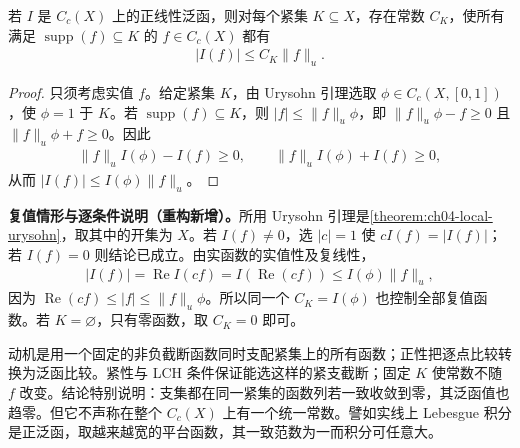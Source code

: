 \documentclass[../../main.tex]{subfiles}
\begin{document}
\begin{proposition}\label{proposition:ch07-positive-local-bound}
若 $I$ 是 $C_c(X)$ 上的正线性泛函，则对每个紧集 $K\subseteq X$，存在常数 $C_K$，使所有满足 $\operatorname{supp}(f)\subseteq K$ 的 $f\in C_c(X)$ 都有
\begin{align*}
|I(f)|\leqslant C_K\|f\|_u.
\end{align*}
\end{proposition}
\begin{proof}
只须考虑实值 $f$。给定紧集 $K$，由 Urysohn 引理选取 $\phi\in C_c(X,[0,1])$，使 $\phi=1$ 于 $K$。若 $\operatorname{supp}(f)\subseteq K$，则 $|f|\leqslant\|f\|_u\phi$，即 $\|f\|_u\phi-f\geqslant0$ 且 $\|f\|_u\phi+f\geqslant0$。因此
\begin{align*}
\|f\|_u I(\phi)-I(f)\geqslant0,
\qquad \|f\|_u I(\phi)+I(f)\geqslant0,
\end{align*}
从而 $|I(f)|\leqslant I(\phi)\|f\|_u$。
\end{proof}
\begin{remark}
\textbf{复值情形与逐条件说明（重构新增）。}所用 Urysohn 引理是\cref{theorem:ch04-local-urysohn}，取其中的开集为 $X$。若 $I(f)\ne0$，选 $|c|=1$ 使 $cI(f)=|I(f)|$；若 $I(f)=0$ 则结论已成立。由实函数的实值性及复线性，
\begin{align*}
|I(f)|=\operatorname{Re}I(cf)=I(\operatorname{Re}(cf))
\leqslant I(\phi)\|f\|_u,
\end{align*}
因为 $\operatorname{Re}(cf)\leqslant|f|\leqslant\|f\|_u\phi$。所以同一个 $C_K=I(\phi)$ 也控制全部复值函数。若 $K=\varnothing$，只有零函数，取 $C_K=0$ 即可。

动机是用一个固定的非负截断函数同时支配紧集上的所有函数；正性把逐点比较转换为泛函比较。紧性与 LCH 条件保证能选这样的紧支截断；固定 $K$ 使常数不随 $f$ 改变。结论特别说明：支集都在同一紧集的函数列若一致收敛到零，其泛函值也趋零。但它不声称在整个 $C_c(X)$ 上有一个统一常数。譬如实线上 Lebesgue 积分是正泛函，取越来越宽的平台函数，其一致范数为一而积分可任意大。
\end{remark}
\end{document}
